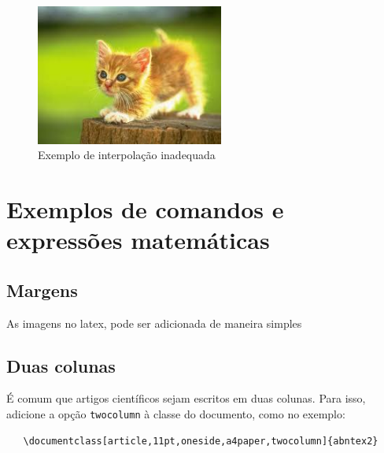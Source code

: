 \documentclass[
	article,			%
	11pt,				%
	oneside,			%
	a4paper,			%
	english,			%
	brazil,				%
	sumario=tradicional
	]{abntex2}
\begin{document}
\begin{figure} [hbt] 
\centering
\label{Rotulo}
\label{figura2} 
\caption{Exemplo de interpolação inadequada}
\includegraphics[width=0.55\textwidth]{gato.jpg}
\end{figure}

\newpage
















\newpage
\section{Exemplos de comandos e expressões matemáticas}

\subsection{Margens}

As imagens no latex, pode ser adicionada de maneira simples

\subsection{Duas colunas}

É comum que artigos científicos sejam escritos em duas colunas. Para isso,
adicione a opção \texttt{twocolumn} à classe do documento, como no exemplo:

\begin{verbatim}
   \documentclass[article,11pt,oneside,a4paper,twocolumn]{abntex2}
\end{verbatim}
\end{document}
